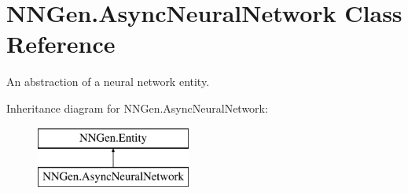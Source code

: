 \hypertarget{class_n_n_gen_1_1_async_neural_network}{}\section{N\+N\+Gen.\+Async\+Neural\+Network Class Reference}
\label{class_n_n_gen_1_1_async_neural_network}


An abstraction of a neural network entity.  


Inheritance diagram for N\+N\+Gen.\+Async\+Neural\+Network\+:\begin{figure}[H]
\begin{center}
\leavevmode
\includegraphics[height=2.000000cm]{class_n_n_gen_1_1_async_neural_network}
\end{center}
\end{figure}
